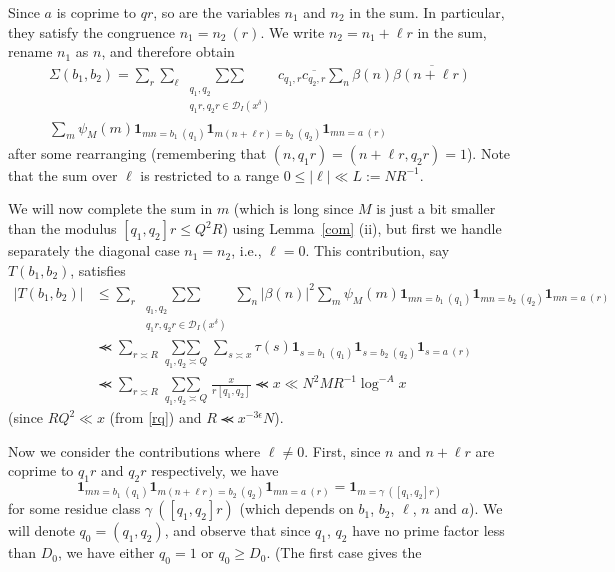 \documentclass[12pt,a4paper,reqno]{amsart}
\numberwithin{equation}{section}
\theoremstyle{plain}
\theoremstyle{definition}
\newcommand{\DIone}[2]{\mathcal{D}_{{#1}}({#2})}
\newcommand\sumsum{\mathop{\sum\sum}\limits}
\renewcommand{\sim}{\asymp}
\renewcommand{\lessapprox}{\llcurly}
\newcommand{\onef}{\mathbf{1}}
\begin{document}
Since $a$ is coprime to $qr$, so are the variables $n_1$ and $n_2$ in
the sum. In particular, they satisfy the congruence $n_1=n_2\ (r)$. We
write $n_2=n_1+\ell r$ in the sum, rename $n_1$ as $n$, and therefore
obtain
\begin{multline*}
  \Sigma(b_1,b_2)=\sum_r\sum_{\ell}
  \sumsum_{\substack{q_1,q_2\\q_1r,q_2r\in \DIone{I}{x^{\delta}}}}
  c_{q_1,r}\overline{c_{q_2,r}} \sum_n\beta(n)\overline{\beta(n+\ell
    r)} \\\sum_{m} \psi_M(m)\onef_{mn = b_1\ (q_1)} \onef_{m(n+\ell r)
    = b_2\ (q_2)}\onef_{mn=a\ (r)}
\end{multline*}
after some rearranging (remembering that $(n,q_1r)=(n+\ell r,q_2 r)=1$).
Note that the sum over $\ell$ is restricted to a range $0\leq
|\ell|\ll L:=NR^{-1}$.  
\par
We will now complete the sum in $m$ (which is long since $M$ is just a
bit smaller than the modulus $[q_1,q_2]r\leq Q^2R$) using
Lemma~\ref{com} (ii), but first we handle separately the diagonal case
$n_1=n_2$, i.e., $\ell=0$. This contribution, say $T(b_1,b_2)$, satisfies
\begin{align*}
  |T(b_1,b_2)|&\leq \sum_r \sumsum_{\substack{q_1,q_2\\q_1r,q_2r\in
      \DIone{I}{x^{\delta}}}} \sum_n|\beta(n)|^2 \sum_{m}
  \psi_M(m)\onef_{mn = b_1\ (q_1)}
  \onef_{mn = b_2\ (q_2)}\onef_{mn=a\ (r)}\\
  &\lessapprox \sum_{r\sim R}\sumsum_{q_1,q_2\sim Q} \sum_{s\sim x}
  \tau(s)\onef_{s = b_1\ (q_1)} \onef_{s = b_2\ (q_2)}\onef_{s=a\
    (r)}\\
  &\lessapprox \sum_{r\sim R}\sumsum_{q_1,q_2\sim Q} \frac{x}{r[q_1,q_2]}\lessapprox x\ll N^2 M R^{-1} \log^{-A} x
\end{align*}
(since $RQ^2\ll x$ (from \eqref{rq}) and $R\lessapprox x^{-3\epsilon }N$).
\par
Now we consider the contributions where $\ell \neq 0$. First, since $n$
and $n+\ell r$ are coprime to $q_1r$ and $q_2r$ respectively, we have
\begin{equation}\label{eq-gamma}
\onef_{mn = b_1\ (q_1)} \onef_{m(n+\ell r) = b_2\ (q_2)}
\onef_{mn=a\ (r)}=\onef_{m=\gamma\ ([q_1,q_2]r)}
\end{equation}
for some residue class $\gamma\ ([q_1,q_2]r)$ (which depends on $b_1$,
$b_2$, $\ell$, $n$ and $a$). We will denote $q_0=(q_1,q_2)$, and observe
that since $q_1$, $q_2$ have no prime factor less than $D_0$, we have
either $q_0=1$ or $q_0\geq D_0$. (The first case gives the
\end{document}
